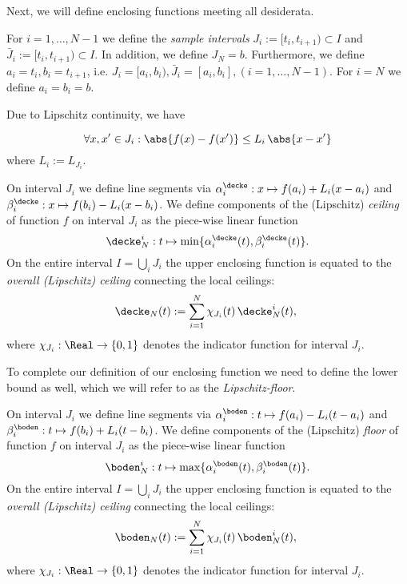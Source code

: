 Next, we will define enclosing functions meeting all desiderata.

For $i=1,\ldots,N-1$ we define the \emph{sample intervals} $J_i :=
[t_i,t_{i+1}) \subset I$ and $\bar J_i :=
[t_i,t_{i+1}) \subset I$. In addition, we define $J_N = b$. Furthermore, we define $a_i = t_i, b_i =
t_{i+1}$, i.e. $J_i= [a_i,b_i), \bar J_i= [a_i,b_i], (i=1,\ldots,N-1)$. For $i=N$ we define $a_i=b_i=b$.


Due to Lipschitz continuity, we have

\begin{equation} \forall x,x' \in J_i: \abs{f(x) - f(x')} \leq L_i \,
\abs{x-x'}
\end{equation}
where $L_i := L_{J_i}$.

\begin{defn}\label{def:lipceil}
On interval $J_i$ we define line segments via $\alpha^\decke_i: x
\mapsto f(a_i) + L_i (x - a_i)$ and $\beta^\decke_i: x \mapsto
f(b_i) -L_i (x - b_i)$. We define components of the (Lipschitz)
\emph{ceiling} of function $f$ on interval $J_i$ as the piece-wise
linear function
\[\decke^i_N: t \mapsto \min\{ \alpha^\decke_i(t), \beta^\decke_i(t) \}.\] On
the entire interval $I = \bigcup_i J_i$ the upper enclosing function
is equated to the \emph{ overall (Lipschitz) ceiling} connecting the
local ceilings:
\[ \decke_N (t) :=   \sum_{i=1}^{N}  \chi_{J_i}(t) \,\decke^i_N(t),\,\,  \]
where $\chi_{J_i}: \Real \to \{0,1\}$ denotes the indicator function
for interval $J_i$.
\end{defn}
To complete our definition of our enclosing function we need to
define the lower bound as well, which we will refer to as the
\emph{Lipschitz-floor}.

\begin{defn}\label{def:lipbot}
On interval $J_i$ we define line segments via $\alpha^\boden_i: t
\mapsto f(a_i) - L_i (t - a_i)$ and $\beta^\boden_i: t \mapsto
f(b_i) +L_i (t - b_i)$. We define components of the (Lipschitz)
\emph{floor} of function $f$ on interval $J_i$ as the piece-wise
linear function
\[\boden^i_N: t \mapsto \max\{ \alpha^\boden_i(t), \beta^\boden_i(t) \}.\] On
the entire interval $I = \bigcup_i J_i$ the upper enclosing function
is equated to the \emph{ overall (Lipschitz) ceiling} connecting the
local ceilings:
\[ \boden_N (t) :=  \sum_{i=1}^{N}  \chi_{J_i}(t) \,\boden^i_N(t),\,\,  \]
where $\chi_{J_i}: \Real \to \{0,1\}$ denotes the indicator function
for interval $J_i$.
\end{defn}



